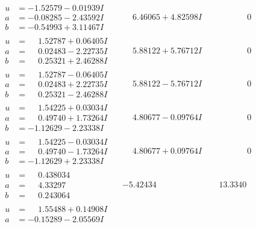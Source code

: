 \documentclass[1p]{elsarticle_modified}
\theoremstyle{definition}
\begin{document}
$$\begin{array}{c|c|c}
\begin{aligned}
u &= -1.52579 - 0.01939 I \\
a &= -0.08285 - 2.43592 I \\
b &= -0.54993 + 3.11467 I\end{aligned}
 & \phantom{-}6.46065 + 4.82598 I & \phantom{-0.000000 } 0 \\ \hline\begin{aligned}
u &= \phantom{-}1.52787 + 0.06405 I \\
a &= \phantom{-}0.02483 - 2.22735 I \\
b &= \phantom{-}0.25321 + 2.46288 I\end{aligned}
 & \phantom{-}5.88122 + 5.76712 I & \phantom{-0.000000 } 0 \\ \hline\begin{aligned}
u &= \phantom{-}1.52787 - 0.06405 I \\
a &= \phantom{-}0.02483 + 2.22735 I \\
b &= \phantom{-}0.25321 - 2.46288 I\end{aligned}
 & \phantom{-}5.88122 - 5.76712 I & \phantom{-0.000000 } 0 \\ \hline\begin{aligned}
u &= \phantom{-}1.54225 + 0.03034 I \\
a &= \phantom{-}0.49740 + 1.73264 I \\
b &= -1.12629 - 2.23338 I\end{aligned}
 & \phantom{-}4.80677 - 0.09764 I & \phantom{-0.000000 } 0 \\ \hline\begin{aligned}
u &= \phantom{-}1.54225 - 0.03034 I \\
a &= \phantom{-}0.49740 - 1.73264 I \\
b &= -1.12629 + 2.23338 I\end{aligned}
 & \phantom{-}4.80677 + 0.09764 I & \phantom{-0.000000 } 0 \\ \hline\begin{aligned}
u &= \phantom{-}0.438034\phantom{ +0.000000I} \\
a &= \phantom{-}4.33297\phantom{ +0.000000I} \\
b &= \phantom{-}0.243064\phantom{ +0.000000I}\end{aligned}
 & -5.42434\phantom{ +0.000000I} & \phantom{-}13.3340\phantom{ +0.000000I} \\ \hline\begin{aligned}
u &= \phantom{-}1.55488 + 0.14908 I \\
a &= -0.15289 - 2.05569 I \\

\end{aligned}
\end{array}$$
\end{document}
